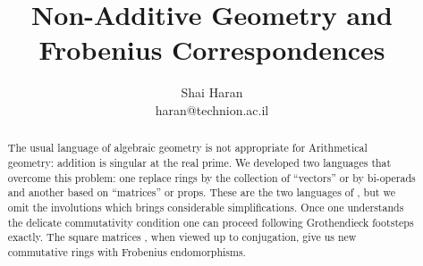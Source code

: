 \documentclass[leqno]{article}
\title{Non-Additive Geometry and Frobenius Correspondences}
\author{Shai Haran \\ {haran@technion.ac.il} }
\date{}
\numberwithin{equation}{section}
\begin{document}
\maketitle
\begin{abstract}
  The usual language of algebraic geometry is not appropriate for
  Arithmetical geometry: addition is singular at the real prime. We
  developed two languages that overcome this problem: one replace
  rings by the collection of “vectors” or by bi-operads and another
  based on “matrices” or props. These are the two languages of
  \cite{H17}, but we omit the involutions which brings considerable
  simplifications. Once one understands the delicate commutativity
  condition one can proceed following Grothendieck footsteps exactly.
  The square matrices , when viewed up to conjugation, give us new
  commutative rings with Frobenius endomorphisms.
\end{abstract}
\end{document}

